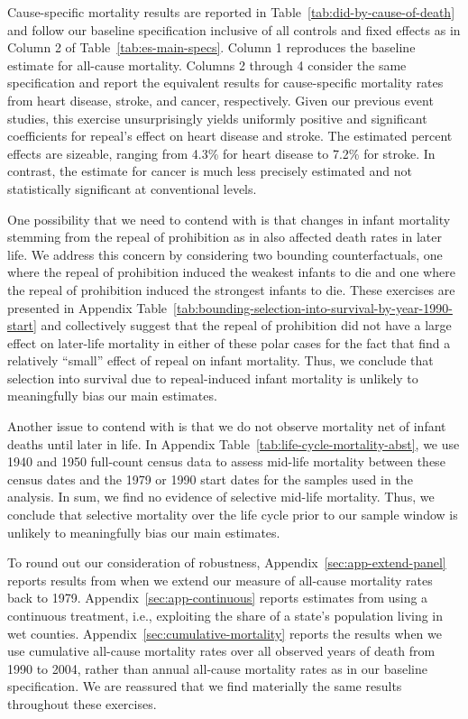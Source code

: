 \documentclass[12pt]{article}
\begin{document}
Cause-specific mortality results are reported in Table~\ref{tab:did-by-cause-of-death} and follow our baseline specification inclusive of all controls and fixed effects as in Column 2 of Table~\ref{tab:es-main-specs}. 
Column 1 reproduces the baseline estimate for all-cause mortality. 
Columns 2 through 4 consider the same specification and report the equivalent results for cause-specific mortality rates from heart disease, stroke, and cancer, respectively. 
Given our previous event studies, this exercise unsurprisingly yields uniformly positive and significant coefficients for repeal's effect on heart disease and stroke. 
The estimated percent effects are sizeable, ranging from 4.3\% for heart disease to 7.2\% for stroke. 
In contrast, the estimate for cancer is much less precisely estimated and not statistically significant at conventional levels. 

One possibility that we need to contend with is that changes in infant mortality stemming from the repeal of prohibition as in  also affected death rates in later life. 
We address this concern by considering two bounding counterfactuals, one where the repeal of prohibition induced the weakest infants to die and one where the repeal of prohibition induced the strongest infants to die. 
These exercises are presented in Appendix Table~\ref{tab:bounding-selection-into-survival-by-year-1990-start} and collectively suggest that the repeal of prohibition did not have a large effect on later-life mortality in either of these polar cases for the fact that  find a relatively ``small'' effect of repeal on infant mortality. 
Thus, we conclude that selection into survival due to repeal-induced infant mortality is unlikely to meaningfully bias our main estimates.

Another issue to contend with is that we do not observe mortality net of infant deaths until later in life. 
In Appendix Table~\ref{tab:life-cycle-mortality-abst}, we use 1940 and 1950 full-count census data to assess mid-life mortality between these census dates and the 1979 or 1990 start dates for the samples used in the analysis. 
In sum, we find no evidence of selective mid-life mortality. 
Thus, we conclude that selective mortality over the life cycle prior to our sample window is unlikely to meaningfully bias our main estimates.

To round out our consideration of robustness, Appendix~\ref{sec:app-extend-panel} reports results from when we extend our measure of all-cause mortality rates back to 1979. 
Appendix~\ref{sec:app-continuous} reports estimates from using a continuous treatment, i.e., exploiting the share of a state's population living in wet counties. 
Appendix~\ref{sec:cumulative-mortality} reports the results when we use cumulative all-cause mortality rates over all observed years of death from 1990 to 2004, rather than annual all-cause mortality rates as in our baseline specification. We are reassured that we find materially the same results throughout these exercises.
\end{document}
